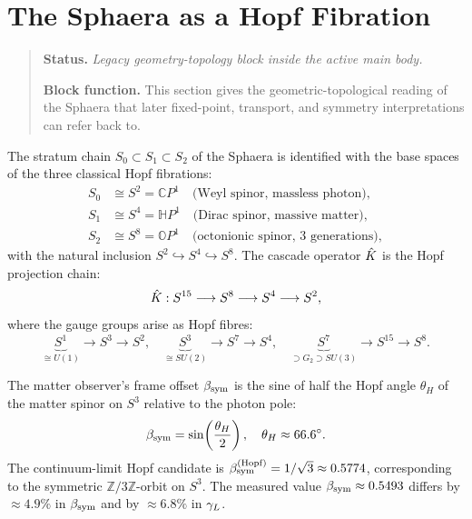 \section{The Sphaera as a Hopf Fibration}
\begin{quote}\small
\noindent\textbf{Status.} \emph{Legacy geometry-topology block inside the active main body.}\par
\noindent\textbf{Block function.} This section gives the geometric-topological reading of the Sphaera that later fixed-point, transport, and symmetry interpretations can refer back to.
\end{quote}
\label{sec:hopf}

\begin{theorem}\label{thm:hopf}
The stratum chain $S_0\subset S_1\subset S_2$ of the Sphaera is
identified with the base spaces of the three classical Hopf fibrations:
\begin{align*}
  S_0 &\cong S^2 = \mathbb{C}P^1
       \quad\text{(Weyl spinor, massless photon)},\\
  S_1 &\cong S^4 = \mathbb{H}P^1
       \quad\text{(Dirac spinor, massive matter)},\\
  S_2 &\cong S^8 = \mathbb{O}P^1
       \quad\text{(octonionic spinor, 3 generations)},
\end{align*}
with the natural inclusion $S^2\hookrightarrow S^4\hookrightarrow S^8$.
The cascade operator $\hat{K}$ is the Hopf projection chain:
\[
  \hat{K}: S^{15}\longrightarrow S^8\longrightarrow S^4\longrightarrow S^2,
\]
where the gauge groups arise as Hopf fibres:
\[
  \underbrace{S^1}_{\cong U(1)}\to S^3\to S^2,\quad
  \underbrace{S^3}_{\cong SU(2)}\to S^7\to S^4,\quad
  \underbrace{S^7}_{\supset G_2\supset SU(3)}\to S^{15}\to S^8.
\]
\end{theorem}

\begin{theorem}
\label{thm:bsym-hopf}
The matter observer's frame offset $\beta_{\mathrm{sym}}$ is the sine of half the Hopf
angle $\theta_H$ of the matter spinor on $S^3$ relative to the photon
pole:
\[
  \beta_{\mathrm{sym}} = \sin\!\left(\frac{\theta_H}{2}\right),\quad\theta_H\approx 66.6^\circ.
\]
The continuum-limit Hopf candidate is $\beta_{\mathrm{sym}}^{(\rm Hopf)}=1/\sqrt{3}\approx
0.5774$, corresponding to the symmetric $\mathbb{Z}/3\mathbb{Z}$-orbit
on $S^3$. The measured value $\beta_{\mathrm{sym}}\approx 0.5493$ differs by
$\approx 4.9\%$ in $\beta_{\mathrm{sym}}$ and by $\approx 6.8\%$ in $\gamma_L$.
\end{theorem}

